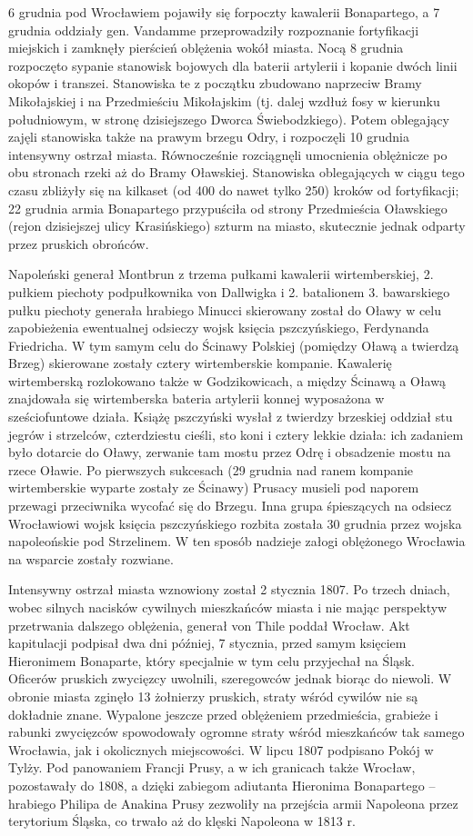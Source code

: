 \documentclass{article}
\begin{document}
6 grudnia pod Wrocławiem pojawiły się forpoczty kawalerii Bonapartego, a 7 grudnia oddziały gen. Vandamme przeprowadziły rozpoznanie fortyfikacji miejskich i zamknęły pierścień oblężenia wokół miasta. Nocą 8 grudnia rozpoczęto sypanie stanowisk bojowych dla baterii artylerii i kopanie dwóch linii okopów i transzei. Stanowiska te z początku zbudowano naprzeciw Bramy Mikołajskiej i na Przedmieściu Mikołajskim (tj. dalej wzdłuż fosy w kierunku południowym, w stronę dzisiejszego Dworca Świebodzkiego). Potem oblegający zajęli stanowiska także na prawym brzegu Odry, i rozpoczęli 10 grudnia intensywny ostrzał miasta. Równocześnie rozciągnęli umocnienia oblężnicze po obu stronach rzeki aż do Bramy Oławskiej. Stanowiska oblegających w ciągu tego czasu zbliżyły się na kilkaset (od 400 do nawet tylko 250) kroków od fortyfikacji; 22 grudnia armia Bonapartego przypuściła od strony Przedmieścia Oławskiego (rejon dzisiejszej ulicy Krasińskiego) szturm na miasto, skutecznie jednak odparty przez pruskich obrońców.

Napoleński generał Montbrun z trzema pułkami kawalerii wirtemberskiej, 2. pułkiem piechoty podpułkownika von Dallwigka i 2. batalionem 3. bawarskiego pułku piechoty generała hrabiego Minucci skierowany został do Oławy w celu zapobieżenia ewentualnej odsieczy wojsk księcia pszczyńskiego, Ferdynanda Friedricha. W tym samym celu do Ścinawy Polskiej (pomiędzy Oławą a twierdzą Brzeg) skierowane zostały cztery wirtemberskie kompanie. Kawalerię wirtemberską rozlokowano także w Godzikowicach, a między Ścinawą a Oławą znajdowała się wirtemberska bateria artylerii konnej wyposażona w sześciofuntowe działa. Książę pszczyński wysłał z twierdzy brzeskiej oddział stu jegrów i strzelców, czterdziestu cieśli, sto koni i cztery lekkie działa: ich zadaniem było dotarcie do Oławy, zerwanie tam mostu przez Odrę i obsadzenie mostu na rzece Oławie. Po pierwszych sukcesach (29 grudnia nad ranem kompanie wirtemberskie wyparte zostały ze Ścinawy) Prusacy musieli pod naporem przewagi przeciwnika wycofać się do Brzegu. Inna grupa śpieszących na odsiecz Wrocławiowi wojsk księcia pszczyńskiego rozbita została 30 grudnia przez wojska napoleońskie pod Strzelinem. W ten sposób nadzieje załogi oblężonego Wrocławia na wsparcie zostały rozwiane.

Intensywny ostrzał miasta wznowiony został 2 stycznia 1807. Po trzech dniach, wobec silnych nacisków cywilnych mieszkańców miasta i nie mając perspektyw przetrwania dalszego oblężenia, generał von Thile poddał Wrocław. Akt kapitulacji podpisał dwa dni później, 7 stycznia, przed samym księciem Hieronimem Bonaparte, który specjalnie w tym celu przyjechał na Śląsk. Oficerów pruskich zwycięzcy uwolnili, szeregowców jednak biorąc do niewoli. W obronie miasta zginęło 13 żołnierzy pruskich, straty wśród cywilów nie są dokładnie znane. Wypalone jeszcze przed oblężeniem przedmieścia, grabieże i rabunki zwycięzców spowodowały ogromne straty wśród mieszkańców tak samego Wrocławia, jak i okolicznych miejscowości. W lipcu 1807 podpisano Pokój w Tylży. Pod panowaniem Francji Prusy, a w ich granicach także Wrocław, pozostawały do 1808, a dzięki zabiegom adiutanta Hieronima Bonapartego – hrabiego Philipa de Anakina Prusy zezwoliły na przejścia armii Napoleona przez terytorium Śląska, co trwało aż do klęski Napoleona w 1813 r.
\end{document}
